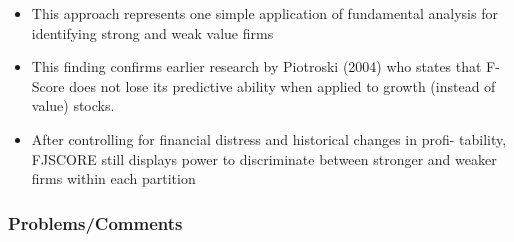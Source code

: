 \documentclass[12pt]{article}
\begin{document}
\begin{itemize}
            \item This approach represents one simple application of fundamental analysis for identifying strong and weak value firms \citep{Piotroski2000}

            \item This finding confirms earlier research by Piotroski (2004) who states that F-Score does not lose its predictive ability when applied to growth (instead of value) stocks. \citep{Mohr2012}

            \item After controlling for financial distress and historical changes in profi- tability, FJSCORE still displays power to discriminate between stronger and weaker firms within each partition \citep{Piotroski2000}

        \end{itemize}

    \subsubsection{Problems/Comments}
\end{document}
